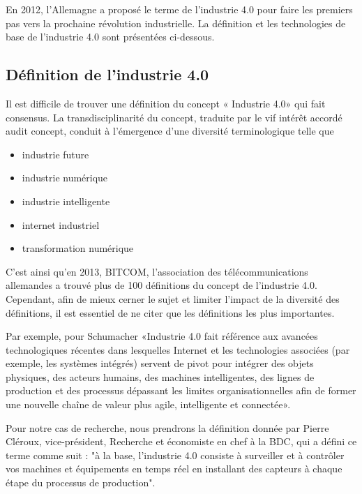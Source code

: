 En 2012, l'Allemagne a proposé le terme de l'industrie 4.0 pour faire les premiers pas vers la prochaine révolution industrielle. La définition et les technologies de base de l'industrie 4.0 sont présentées ci-dessous.

\subsection{Définition de l’industrie 4.0}
Il est difficile de trouver une définition du concept « Industrie 4.0» qui fait consensus. La transdisciplinarité du concept, traduite par le vif intérêt accordé audit concept, conduit à l'émergence d'une diversité terminologique telle que 
\begin{itemize}
    \item industrie future
    \item industrie numérique
    \item industrie intelligente
    \item internet industriel
    \item transformation numérique
\end{itemize}
C'est ainsi qu'en 2013, BITCOM, l'association des télécommunications allemandes a trouvé plus de 100 définitions du concept de l'industrie 4.0. Cependant, afin de mieux cerner le sujet et limiter l'impact de la diversité des définitions, il est essentiel de ne citer que les définitions les plus importantes.

Par exemple, pour Schumacher \cite{schumacherMaturityModelAssessing2016} «Industrie 4.0 fait référence aux avancées technologiques récentes dans lesquelles Internet et les technologies associées (par exemple, les systèmes intégrés) servent de pivot pour intégrer des objets physiques, des acteurs humains, des machines intelligentes, des lignes de production et des processus dépassant les limites organisationnelles afin de former une nouvelle chaîne de valeur plus agile, intelligente et connectée».

Pour notre cas de recherche, nous prendrons la définition donnée par Pierre Cléroux, vice-président, Recherche et économiste en chef à la BDC, qui a défini ce terme comme suit : "à la base, l'industrie 4.0 consiste à surveiller et à contrôler vos machines et équipements en temps réel en installant des capteurs à chaque étape du processus de production".

\newpage

